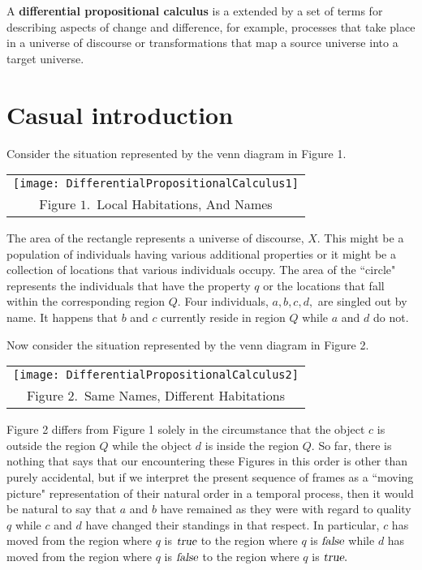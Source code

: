 \documentclass[12pt]{article}
\begin{document}
A \textbf{differential propositional calculus} is a  extended by a set of terms for describing aspects of change and difference, for example, processes that take place in a universe of discourse or transformations that map a source universe into a target universe.

\tableofcontents

\section{Casual introduction}

Consider the situation represented by the venn diagram in Figure 1.

\begin{center}\begin{tabular}{c}
\texttt{[image: DifferentialPropositionalCalculus1]}
\\
Figure $1.$\ Local Habitations, And Names
\end{tabular}\end{center}

The area of the rectangle represents a universe of discourse, $X.$  This might be a population of individuals having various additional properties or it might be a collection of locations that various individuals occupy.  The area of the ``circle" represents the individuals that have the property $q$ or the locations that fall within the corresponding region $Q.$  Four individuals, $a, b, c, d,$ are singled out by name.  It happens that $b$ and $c$ currently reside in region $Q$ while $a$ and $d$ do not.

Now consider the situation represented by the venn diagram in Figure 2.

\begin{center}\begin{tabular}{c}
\texttt{[image: DifferentialPropositionalCalculus2]}
\\
Figure $2.$\ Same Names, Different Habitations
\end{tabular}\end{center}

Figure 2 differs from Figure 1 solely in the circumstance that the object $c$ is outside the region $Q$ while the object $d$ is inside the region $Q.$  So far, there is nothing that says that our encountering these Figures in this order is other than purely accidental, but if we interpret the present sequence of frames as a ``moving picture" representation of their natural order in a temporal process, then it would be natural to say that $a$ and $b$ have remained as they were with regard to quality $q$ while $c$ and $d$ have changed their standings in that respect.  In particular, $c$ has moved from the region where $q$ is $\textsl{true}$ to the region where $q$ is $\textsl{false}$ while $d$ has moved from the region where $q$ is $\textsl{false}$ to the region where $q$ is $\textsl{true}.$
\end{document}
